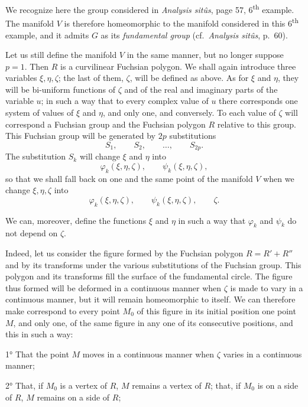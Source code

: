 \documentclass{article}
\begin{document}
We recognize here the group considered in \emph{Analysis sitûs}, page 57, 6\textsuperscript{th} example. The manifold $V$ is therefore homeomorphic to the manifold considered in this 6\textsuperscript{th} example, and it admits $G$ as its \emph{fundamental group} (cf.\ \emph{Analysis sitûs}, p.\ 60).

Let us still define the manifold $V$ in the same manner, but no longer suppose $p = 1$. Then $R$ is a curvilinear Fuchsian polygon. We shall again introduce three variables $\xi, \eta, \zeta$; the last of them, $\zeta$, will be defined as above. As for $\xi$ and $\eta$, they will be bi-uniform functions of $\zeta$ and of the real and imaginary parts of the variable $u$; in such a way that to every complex value of $u$ there corresponds one system of values of $\xi$ and $\eta$, and only one, and conversely. To each value of $\zeta$ will correspond a Fuchsian group and the Fuchsian polygon $R$ relative to this group. This Fuchsian group will be generated by $2p$ substitutions
\[ S_{1}, \qquad S_{2}, \qquad \ldots, \qquad S_{2p}. \]
The substitution $S_{k}$ will change $\xi$ and $\eta$ into
\[ \varphi_{k}(\xi, \eta, \zeta), \qquad \psi_{k}(\xi, \eta, \zeta), \]
so that we shall fall back on one and the same point of the manifold $V$ when we change $\xi, \eta, \zeta$ into
\[ \varphi_{k}(\xi, \eta, \zeta), \qquad \psi_{k}(\xi, \eta, \zeta), \qquad \zeta. \]


We can, moreover, define the functions $\xi$ and $\eta$ in such a way that $\varphi_{k}$ and $\psi_{k}$ do not depend on $\zeta$.

Indeed, let us consider the figure formed by the Fuchsian polygon $R = R' + R''$ and by its transforms under the various substitutions of the Fuchsian group. This polygon and its transforms fill the surface of the fundamental circle. The figure thus formed will be deformed in a continuous manner when $\zeta$ is made to vary in a continuous manner, but it will remain homeomorphic to itself. We can therefore make correspond to every point $M_{0}$ of this figure in its initial position one point $M$, and only one, of the same figure in any one of its consecutive positions, and this in such a way:

1° That the point $M$ moves in a continuous manner when $\zeta$ varies in a continuous manner;

2° That, if $M_{0}$ is a vertex of $R$, $M$ remains a vertex of $R$; that, if $M_{0}$ is on a side of $R$, $M$ remains on a side of $R$;
\end{document}
